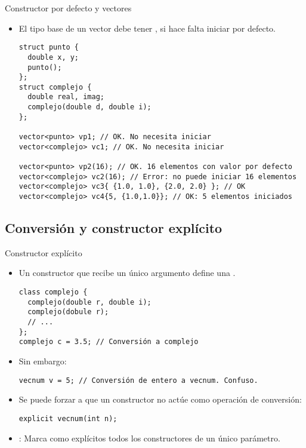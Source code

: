 \begin{frame}[t,fragile]{Constructor por defecto y vectores}
\begin{itemize}
  \item El tipo base de un vector debe tener , 
        si hace falta iniciar por defecto.
\begin{lstlisting}
struct punto {
  double x, y;
  punto();
};
struct complejo {
  double real, imag;
  complejo(double d, double i);
};

vector<punto> vp1; // OK. No necesita iniciar
vector<complejo> vc1; // OK. No necesita iniciar

vector<punto> vp2(16); // OK. 16 elementos con valor por defecto
vector<complejo> vc2(16); // Error: no puede iniciar 16 elementos
vector<complejo> vc3{ {1.0, 1.0}, {2.0, 2.0} }; // OK
vector<complejo> vc4{5, {1.0,1.0}}; // OK: 5 elementos iniciados
\end{lstlisting}
\end{itemize}
\end{frame}

\subsection{Conversión y constructor explícito}

\begin{frame}[fragile]{Constructor explícito}
\begin{itemize}
  \item Un constructor que recibe un único argumento define una 
        .
\begin{lstlisting}
class complejo {
  complejo(double r, double i);
  complejo(dobule r);
  // ...
};
complejo c = 3.5; // Conversión a complejo
\end{lstlisting}

  \item Sin embargo:
\begin{lstlisting}
vecnum v = 5; // Conversión de entero a vecnum. Confuso.
\end{lstlisting}

  \item Se puede forzar a que un constructor no actúe como operación de conversión:
\begin{lstlisting}
explicit vecnum(int n);
\end{lstlisting}

  \item {}: Marca como explícitos todos los constructores
        de un único parámetro.
\end{itemize}
\end{frame}

